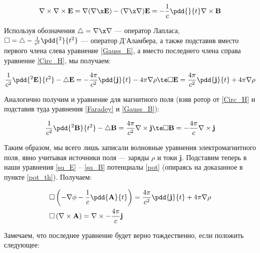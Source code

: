 \documentclass[12pt]{kiarticle}
\begin{document}
\begin{equation}\label{}
\nabla \times \nabla \times \mathbf{E} = \nabla (\nabla \x \mathbf{E}) - (\nabla \x \nabla) \mathbf{E} = - \dfrac{1}{c} \pdd{}{t}\nabla \times \mathbf{B}
\end{equation}

Используя обозначения $ \triangle = \nabla \x \nabla $  --- оператор Лапласа, $ \square = \triangle -  \frac{1}{c^2}\pdd{^2}{t^2}$ --- оператор Д'Аламбера, а также подставив вместо первого члена слева уравнение \eqref{Gauss_E}, а вместо последнего члена справа уравнение \eqref{Circ_H}, мы получаем:

\begin{equation}\label{sq_E}
\dfrac{1}{c^2}\pdd{^2\mathbf{E}}{t^2} - \triangle \mathbf{E} = - \dfrac{4\pi}{c^2} \pdd{\mathbf{j}}{t} - 4 \pi \nabla \rho \te \square \mathbf{E} = \dfrac{4\pi}{c^2} \pdd{\mathbf{j}}{t} + 4 \pi \nabla \rho
\end{equation}

Аналогично получим и уравнение для магнитного поля (взяв ротор от \eqref{Circ_H} и подставив туда уравнения \eqref{Faradey} и \eqref{Gauss_B}):

\begin{equation}\label{sq_B}
\dfrac{1}{c^2}\pdd{^2\mathbf{B}}{t^2} - \triangle \mathbf{B} = \dfrac{4\pi}{c^2} \nabla \times \mathbf{j} \te \square \mathbf{B} = - \dfrac{4\pi}{c} \nabla \times \mathbf{j}
\end{equation}

Таким образом, мы всего лишь записали волновные уравнения электромагнитного поля, явно учитывая источники поля --- заряды $ \rho $ и токи $ \mathbf{j} $. Подставим теперь в наши уравнения \eqref{sq_E} -- \eqref{sq_B} потенциалы \eqref{pot} (опираясь на доказанное в пункте \ref{pot_th}). Получаем:

\begin{equation}\label{sq}
\left.
\begin{aligned}
& \square \left( - \nabla \phi  - \dfrac{1}{c} \pdd{\mathbf{A}}{t} \right) = \dfrac{4\pi}{c^2} \pdd{\mathbf{j}}{t} + 4 \pi \nabla \rho \\
& \square \left( \nabla \times \mathbf{A} \right) = \nabla \times - \dfrac{4\pi}{c}\mathbf{j} \\
\end{aligned}
\right.
\end{equation}

Замечаем, что последнее уравнение будет верно тождественно, если положить следующее: 
\end{document}
